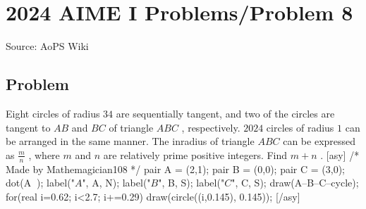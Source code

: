 \documentclass[12pt]{article}
\begin{document}
\section*{{2024 AIME I Problems/Problem 8}}
Source: AoPS Wiki

\subsection*{Problem}
Eight circles of radius $34$ are sequentially tangent, and two of the circles are tangent to $AB$ and $BC$ of triangle $ABC$ , respectively. $2024$ circles of radius $1$ can be arranged in the same manner. The inradius of triangle $ABC$ can be expressed as $\frac{m}{n}$ , where $m$ and $n$ are relatively prime positive integers. Find $m+n$ . [asy] /* Made by Mathemagician108 */ pair A = (2,1); pair B = (0,0); pair C = (3,0); dot(A^^B^^C); label("$A$", A, N); label("$B$", B, S); label("$C$", C, S); draw(A--B--C--cycle); for(real i=0.62; i<2.7; i+=0.29){ draw(circle((i,0.145), 0.145)); } [/asy]
\end{document}
